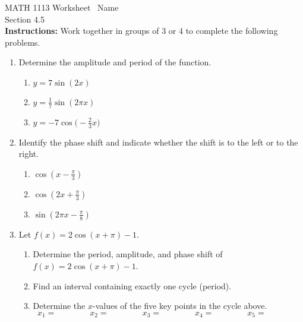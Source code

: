 \documentclass[11pt]{article}
\begin{document}
\noindent MATH 1113   \quad\quad\quad\quad\quad Worksheet \quad\quad\quad\quad\quad\   Name \underline{\phantom{alphabetsoupismyveryveryfavorite}}\\ 
\noindent Section 4.5 \\




\noindent \textbf{Instructions:}  Work together in groups of  3 or 4 to complete the following problems.\\

\begin{enumerate}

\item Determine the amplitude and period of the function.
\begin{enumerate}
\item $y=7\sin(2x)$\\[.5in]
\item $\displaystyle y=\frac{1}{7}\sin(2\pi x)$\\[.5in]
\item $\displaystyle y=-7\cos\Big(-\frac{2}{3}x\Big)$\\[.5in]
\end{enumerate}

\item Identify the phase shift and indicate whether the shift is to the left or to the right.
\begin{enumerate}
\item $\displaystyle \cos(x-\frac{\pi}{3})$\vfill
\item $\displaystyle \cos(2x+\frac{\pi}{3})$\vfill
\item $\displaystyle \sin(2\pi x -\frac{\pi}{8})$\vfill
\end{enumerate}


\newpage
\item Let $f(x)=2\cos(x+\pi)-1$.

\begin{enumerate}

\item Determine the period, amplitude, and phase shift of $f(x)=2\cos(x+\pi)-1$.\vfill
\item Find an interval containing exactly one cycle (period).\vfill
\item Determine the $x$-values of the five key points in the cycle above.
$$x_1= \quad \quad \quad \quad x_2= \quad \quad \quad \quad x_3= \quad \quad \quad \quad x_4= \quad \quad \quad \quad x_5= \quad \quad \quad \quad$$
\vfill






\end{enumerate}
\end{enumerate}
\end{document}
